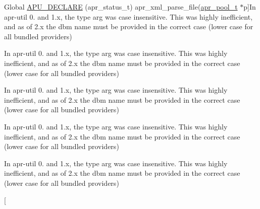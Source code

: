 \begin{DoxyRefList}
Global \hyperlink{group__APR__Util__XML_ga4f95eb2fce8f447db01a30585adbd6dc}{A\+P\+U\+\_\+\+D\+E\+C\+L\+A\+RE} (apr\+\_\+status\+\_\+t) apr\+\_\+xml\+\_\+parse\+\_\+file(\hyperlink{structapr__pool__t}{apr\+\_\+pool\+\_\+t} $\ast$p]In apr-\/util 0. and 1.\+x, the type arg was case insensitive. This was highly inefficient, and as of 2.\+x the dbm name must be provided in the correct case (lower case for all bundled providers)  
\item[\label{bug__bug000019}%
\hypertarget{bug__bug000019}{}%
Global \hyperlink{group__APR__Util__XML_ga4f95eb2fce8f447db01a30585adbd6dc}{A\+P\+U\+\_\+\+D\+E\+C\+L\+A\+RE} (apr\+\_\+status\+\_\+t) apr\+\_\+xml\+\_\+parse\+\_\+file(\hyperlink{structapr__pool__t}{apr\+\_\+pool\+\_\+t} $\ast$p]In apr-\/util 0. and 1.\+x, the type arg was case insensitive. This was highly inefficient, and as of 2.\+x the dbm name must be provided in the correct case (lower case for all bundled providers)  
\item[\label{bug__bug000019}%
\hypertarget{bug__bug000019}{}%
Global \hyperlink{group__APR__Util__XML_ga4f95eb2fce8f447db01a30585adbd6dc}{A\+P\+U\+\_\+\+D\+E\+C\+L\+A\+RE} (apr\+\_\+status\+\_\+t) apr\+\_\+xml\+\_\+parse\+\_\+file(\hyperlink{structapr__pool__t}{apr\+\_\+pool\+\_\+t} $\ast$p]In apr-\/util 0. and 1.\+x, the type arg was case insensitive. This was highly inefficient, and as of 2.\+x the dbm name must be provided in the correct case (lower case for all bundled providers)  
\item[\label{bug__bug000019}%
\hypertarget{bug__bug000019}{}%
Global \hyperlink{group__APR__Util__XML_ga4f95eb2fce8f447db01a30585adbd6dc}{A\+P\+U\+\_\+\+D\+E\+C\+L\+A\+RE} (apr\+\_\+status\+\_\+t) apr\+\_\+xml\+\_\+parse\+\_\+file(\hyperlink{structapr__pool__t}{apr\+\_\+pool\+\_\+t} $\ast$p]In apr-\/util 0. and 1.\+x, the type arg was case insensitive. This was highly inefficient, and as of 2.\+x the dbm name must be provided in the correct case (lower case for all bundled providers)  
\item[\label{bug__bug000019}%
\hypertarget{bug__bug000019}{}%
Global \hyperlink{group__APR__Util__XML_ga4f95eb2fce8f447db01a30585adbd6dc}{A\+P\+U\+\_\+\+D\+E\+C\+L\+A\+RE} (apr\+\_\+status\+\_\+t) apr\+\_\+xml\+\_\+parse\+\_\+file(\hyperlink{structapr__pool__t}{apr\+\_\+pool\+\_\+t} $\ast$p]In apr-\/util 0. and 1.\+x, the type arg was case insensitive. This was highly inefficient, and as of 2.\+x the dbm name must be provided in the correct case (lower case for all bundled providers)  
\item[\label{bug__bug000019}%

\end{DoxyRefList}

